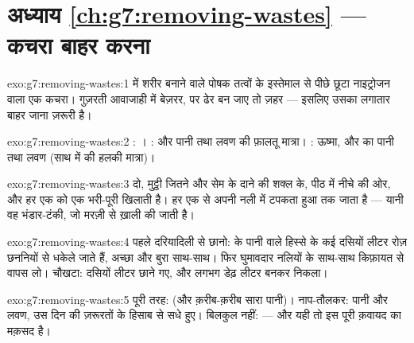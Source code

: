 \section*{अध्याय \ref{ch:g7:removing-wastes} --- कचरा बाहर करना}

\begin{solution}{exo:g7:removing-wastes:1}
 में शरीर बनाने वाले पोषक तत्वों के इस्तेमाल से पीछे छूटा
नाइट्रोजन वाला एक कचरा। गुज़रती आवाजाही में बेज़रर, पर ढेर बन जाए तो
ज़हर --- इसलिए उसका लगातार बाहर जाना ज़रूरी है।
\end{solution}

\begin{solution}{exo:g7:removing-wastes:2}
: । :  और पानी तथा लवण की फ़ालतू
मात्रा। : ऊष्मा, और  का पानी तथा लवण (साथ में  की हलकी
मात्रा)।
\end{solution}

\begin{solution}{exo:g7:removing-wastes:3}
दो, मुट्ठी जितने और सेम के दाने की शक्ल के, पीठ में नीचे की ओर, और हर
एक को एक भरी-पूरी  खिलाती है।  हर एक से अपनी नली में टपकता हुआ
 तक जाता है --- यानी वह भंडार-टंकी, जो मरज़ी से ख़ाली की जाती
है।
\end{solution}

\begin{solution}{exo:g7:removing-wastes:4}
पहले दरियादिली से छानो:  के पानी वाले हिस्से के कई दसियों लीटर रोज़
छननियों से धकेले जाते हैं, अच्छा और बुरा साथ-साथ। फिर घुमावदार नलियों
के साथ-साथ किफ़ायत से वापस लो। चौखटा: दसियों लीटर छाने गए, और लगभग डेढ़
लीटर  बनकर निकला।
\end{solution}

\begin{solution}{exo:g7:removing-wastes:5}
पूरी तरह:  (और क़रीब-क़रीब सारा पानी)। नाप-तौलकर: पानी और लवण,
उस दिन की ज़रूरतों के हिसाब से सधे हुए। बिलकुल नहीं:  --- और यही
तो इस पूरी क़वायद का मक़सद है।
\end{solution}

